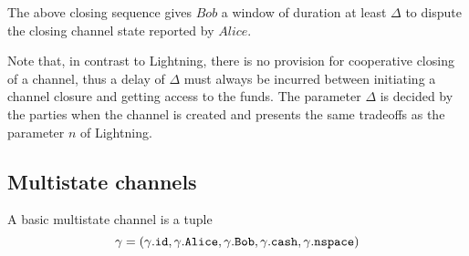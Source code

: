     The above closing sequence gives $Bob$ a window of duration at least $\Delta$ to
    dispute the closing channel state reported by $Alice$.

    Note that, in contrast to Lightning, there is no provision for cooperative closing of
    a channel, thus a delay of $\Delta$ must always be incurred between initiating a
    channel closure and getting access to the funds. The parameter $\Delta$ is decided by
    the parties when the channel is created and presents the same tradeoffs as the
    parameter $n$ of Lightning.

  \subsection{Multistate channels}
    A basic multistate channel is a tuple
    \begin{equation*}
      \gamma = \left(\gamma\mbox{.\texttt{id}}, \gamma\mbox{.\texttt{Alice}},
      \gamma\mbox{.\texttt{Bob}}, \gamma\mbox{.\texttt{cash}},
      \gamma\mbox{.\texttt{nspace}}\right)
    \end{equation*}
